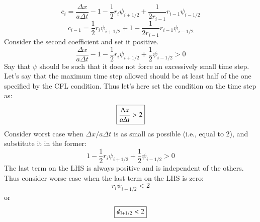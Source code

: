 \documentclass{warpdoc}
\newcommand\frameeqn[1]{\fbox{$\displaystyle #1$}}
\begin{document}
%
%
\begin{equation}
c_i=\frac{\Delta x}{a\Delta t} - 1 - \frac{1}{2} r_i \psi_{i+1/2} + \frac{1}{2 r_{i-1}} r_{i-1} \psi_{i-1/2} 
\end{equation}
%
%
\begin{equation}
c_{i-1}=\frac{1}{2} r_i \psi_{i+1/2} +1 - \frac{1}{2 r_{i-1}} r_{i-1} \psi_{i-1/2} 
\end{equation}
%
Consider the second coefficient and set it positive.
%
\begin{equation}
\frac{\Delta x}{a\Delta t} - 1 - \frac{1}{2} r_i \psi_{i+1/2} + \frac{1}{2 }  \psi_{i-1/2} >0
\end{equation}
%
 Say that $\psi$ should be such that it does not force an excessively small time step. Let's say that the maximum time step allowed should be at least half of the one specified by the CFL condition. Thus let's here set the condition on the time step as:
%
\begin{equation}
\frameeqn{
\frac{\Delta x}{a\Delta t}>2
}
\end{equation}
% 
Consider worst case when $\Delta x/a\Delta t$ is as small as possible (i.e., equal to 2), and substitute it in the former:
%
\begin{equation}
1 - \frac{1}{2} r_i \psi_{i+1/2} + \frac{1}{2 }  \psi_{i-1/2} >0
\end{equation}
%
The last term on the LHS is always positive and is independent of the others. Thus consider worse case when the last term on the LHS is zero:
%
\begin{equation}
   r_i \psi_{i+1/2}  <2
\end{equation}
%
or
%
\begin{equation}
\frameeqn{
   \phi_{i+1/2}  <2
}
\end{equation}
%
\end{document}
